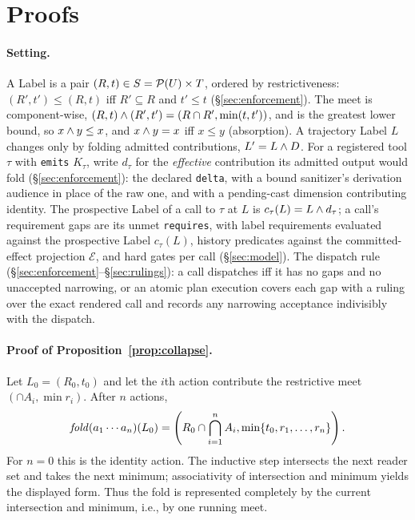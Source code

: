 \section{Proofs}\label{app:proofs}

\paragraph{Setting.}
A Label is a pair $(R,t)\in S=\mathcal{P}(U)\times T$, ordered by restrictiveness: $(R',t')\le(R,t)$ iff $R'\subseteq R$ and $t'\le t$ (\S\ref{sec:enforcement}). The meet is component-wise, $(R,t)\wedge(R',t')=(R\cap R',\min(t,t'))$, and is the greatest lower bound, so $x\wedge y\le x$, and $x\wedge y=x$ iff $x\le y$ (absorption). A trajectory Label $L$ changes only by folding admitted contributions, $L'=L\wedge D$. For a registered tool $\tau$ with \texttt{emits} $K_\tau$, write $d_\tau$ for the \emph{effective} contribution its admitted output would fold (\S\ref{sec:enforcement}): the declared \texttt{delta}, with a bound sanitizer's derivation audience in place of the raw one, and with a pending-cast dimension contributing identity. The prospective Label of a call to $\tau$ at $L$ is $c_\tau(L)=L\wedge d_\tau$; a call's requirement gaps are its unmet \texttt{requires}, with label requirements evaluated against the prospective Label $c_\tau(L)$, history predicates against the committed-effect projection $\mathcal{E}$, and hard gates per call (\S\ref{sec:model}). The dispatch rule (\S\ref{sec:enforcement}--\S\ref{sec:rulings}): a call dispatches iff it has no gaps and no unaccepted narrowing, or an atomic plan execution covers each gap with a ruling over the exact rendered call and records any narrowing acceptance indivisibly with the dispatch.

\paragraph{Proof of Proposition~\ref{prop:collapse}.}
Let $L_0=(R_0,t_0)$ and let the $i$th action contribute the restrictive meet $(\cap A_i,\min r_i)$.  After $n$ actions,
\[
  \mathit{fold}(a_1\cdots a_n)(L_0)
  = \left(R_0 \cap \bigcap_{i=1}^{n} A_i,
           \min\{t_0,r_1,\ldots,r_n\}\right).
\]
For $n=0$ this is the identity action.  The inductive step intersects the next reader set and takes the next minimum; associativity of intersection and minimum yields the displayed form.  Thus the fold is represented completely by the current intersection and minimum, i.e., by one running meet.

